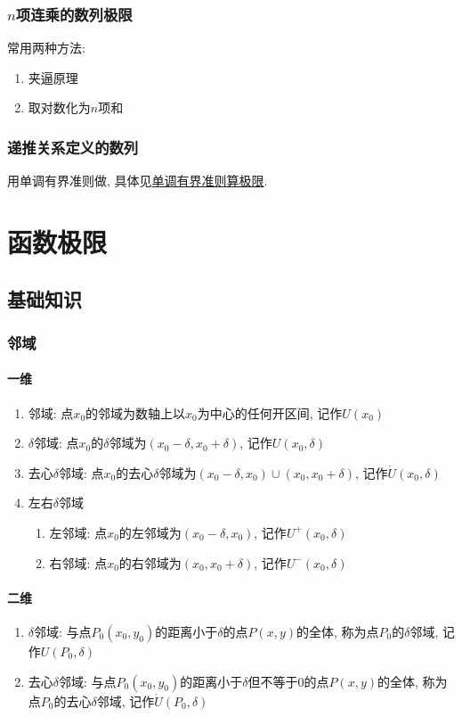 \subsection{$ n $项连乘的数列极限}
常用两种方法:
\begin{enumerate}
\item 夹逼原理
\item 取对数化为$ n $项和
\end{enumerate}
\subsection{递推关系定义的数列}
用单调有界准则做, 具体见\hyperref[单调有界准则算极限]{单调有界准则算极限}.
\chapter{函数极限}
\section{基础知识}
\subsection{邻域}
\subsubsection{一维}
\begin{enumerate}
\item 邻域: 点$ x_{0} $的邻域为数轴上以$ x_{0} $为中心的任何开区间, 记作$ U(x_{0}) $
\item $ \delta $邻域: 点$ x_{0} $的$ \delta $邻域为$ (x_{0}-\delta,x_{0}+\delta) $, 记作$ U(x_{0},\delta) $
\item 去心$ \delta $邻域: 点$ x_{0} $的去心$ \delta $邻域为$ (x_{0}-\delta,x_{0})\cup (x_{0},x_{0}+\delta) $, 记作$ \mathring{U}(x_{0},\delta) $
\item 左右$ \delta $邻域
\begin{enumerate}
\item 左邻域: 点$ x_{0} $的左邻域为$ (x_{0}-\delta,x_{0}) $, 记作$ U^{+}(x_{0},\delta) $
\item 右邻域: 点$ x_{0} $的右邻域为$ (x_{0},x_{0}+\delta) $, 记作$ U^{-}(x_{0},\delta) $
\end{enumerate}
\end{enumerate}
\subsubsection{二维}
\begin{enumerate}
\item $ \delta $邻域: 与点$ P_{0}(x_{0},y_{0}) $的距离小于$ \delta $的点$ P(x,y) $的全体, 称为点$ P_{0} $的$ \delta $邻域, 记作$ U(P_{0},\delta) $
\item 去心$ \delta $邻域: 与点$ P_{0}(x_{0},y_{0}) $的距离小于$ \delta $但不等于0的点$ P(x,y) $的全体, 称为点$ P_{0} $的去心$ \delta $邻域, 记作$ \mathring{U}(P_{0},\delta) $
\end{enumerate}

